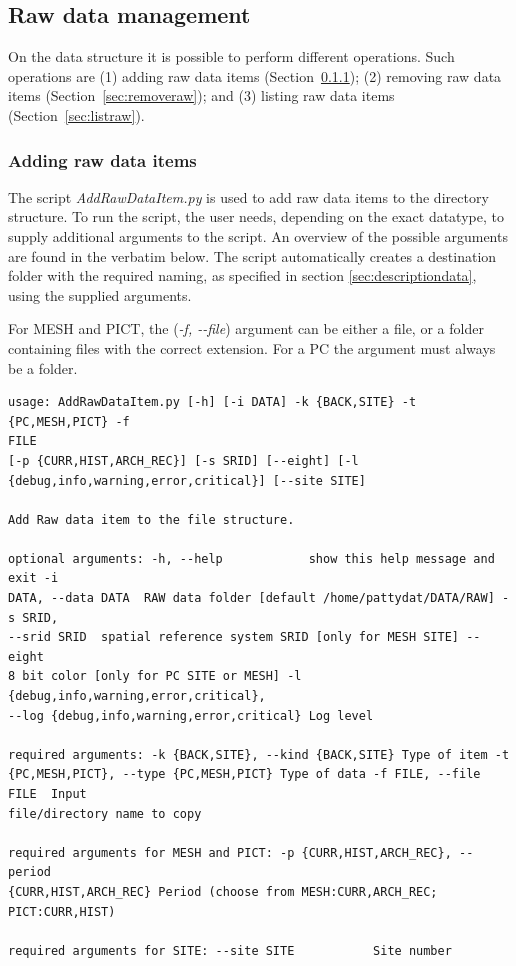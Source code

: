 \subsection{Raw data management}
On the data structure it is possible to perform different operations. Such operations
are (1) adding raw data items (Section~\ref{sec:addraw}); (2) removing raw data
items (Section~\ref{sec:removeraw}); and (3) listing raw data items (Section~\ref{sec:listraw}).

\subsubsection{Adding raw data items}
\label{sec:addraw} 
The script \textit{AddRawDataItem.py} is used to add raw data items to the directory
structure. To run the script, the user needs, depending on the exact datatype,
to supply additional arguments to the script. An overview of the possible arguments
are found in the verbatim below. The script automatically creates a destination
folder with the required naming, as specified in section \ref{sec:descriptiondata},
using the supplied arguments.

For MESH and PICT, the (\textit{-f, -\hspace{0cm}-file}) argument can be either
a file, or a folder containing files with the correct extension. For a PC the
argument must always be a folder.

\begin{Verbatim}[fontfamily=courier,commandchars=\\\{\},fontsize=\footnotesize]
usage: AddRawDataItem.py [-h] [-i DATA] -k {BACK,SITE} -t {PC,MESH,PICT} -f
FILE
[-p {CURR,HIST,ARCH_REC}] [-s SRID] [--eight] [-l
{debug,info,warning,error,critical}] [--site SITE]

Add Raw data item to the file structure.

optional arguments: -h, --help            show this help message and exit -i
DATA, --data DATA  RAW data folder [default /home/pattydat/DATA/RAW] -s SRID,
--srid SRID  spatial reference system SRID [only for MESH SITE] --eight
8 bit color [only for PC SITE or MESH] -l {debug,info,warning,error,critical},
--log {debug,info,warning,error,critical} Log level

required arguments: -k {BACK,SITE}, --kind {BACK,SITE} Type of item -t
{PC,MESH,PICT}, --type {PC,MESH,PICT} Type of data -f FILE, --file FILE  Input
file/directory name to copy

required arguments for MESH and PICT: -p {CURR,HIST,ARCH_REC}, --period
{CURR,HIST,ARCH_REC} Period (choose from MESH:CURR,ARCH_REC; PICT:CURR,HIST)

required arguments for SITE: --site SITE           Site number \end{Verbatim}

